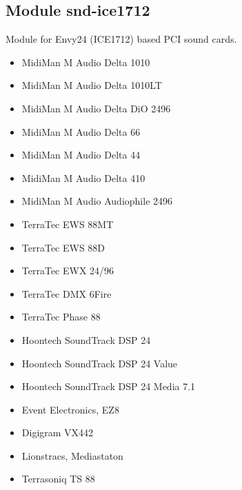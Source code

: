 \documentclass[a4paper,8pt,english]{sphinxmanual}
\begin{document}
\subsection{Module snd-ice1712}
\label{sound/alsa-configuration:module-snd-ice1712}
Module for Envy24 (ICE1712) based PCI sound cards.
\begin{itemize}
\item {} 
MidiMan M Audio Delta 1010

\item {} 
MidiMan M Audio Delta 1010LT

\item {} 
MidiMan M Audio Delta DiO 2496

\item {} 
MidiMan M Audio Delta 66

\item {} 
MidiMan M Audio Delta 44

\item {} 
MidiMan M Audio Delta 410

\item {} 
MidiMan M Audio Audiophile 2496

\item {} 
TerraTec EWS 88MT

\item {} 
TerraTec EWS 88D

\item {} 
TerraTec EWX 24/96

\item {} 
TerraTec DMX 6Fire

\item {} 
TerraTec Phase 88

\item {} 
Hoontech SoundTrack DSP 24

\item {} 
Hoontech SoundTrack DSP 24 Value

\item {} 
Hoontech SoundTrack DSP 24 Media 7.1

\item {} 
Event Electronics, EZ8

\item {} 
Digigram VX442

\item {} 
Lionstracs, Mediastaton

\item {} 
Terrasoniq TS 88

\end{itemize}
\end{document}
